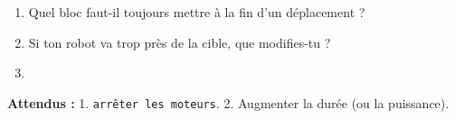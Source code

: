 \documentclass[11pt,a4paper]{article}
\begin{document}
\begin{enumerate}
 \item Quel bloc faut-il toujours mettre à la fin d'un déplacement ?\\ \lig
 \item Si ton robot va trop près de la cible, que modifies-tu ?\\ \lig
 \item \autoeval
\end{enumerate}
\textbf{Attendus :} 1. \texttt{arrêter les moteurs}. 2. Augmenter la durée (ou la puissance).

\bigskip
{}
\end{document}
